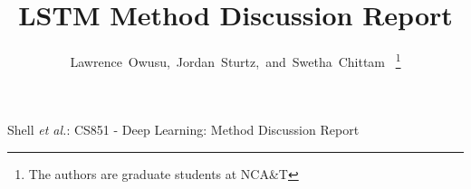 \documentclass[journal]{IEEEtran}
\begin{document}
%
\title{LSTM Method Discussion Report}

\author{Lawrence~Owusu,~Jordan~Sturtz,~and~Swetha~Chittam~%
  \thanks{The authors are graduate students at NCA\&T}%
}

%

%
{Shell \MakeLowercase{\textit{et al.}}: CS851 - Deep Learning: Method Discussion Report}

\maketitle




%
\IEEEpeerreviewmaketitle
\end{document}
